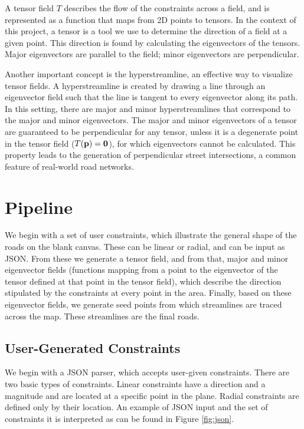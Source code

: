 \documentclass[twocolumn]{article}
\begin{document}
A tensor field $T$ describes the flow of the constraints across a field, and is
represented as a function that maps from 2D points to tensors. In the context
of this project, a tensor is a tool we use to determine the direction of a
field at a given point. This direction is found by calculating the eigenvectors
of the tensors. Major eigenvectors are parallel to the field; minor
eigenvectors are perpendicular.

Another important concept is the hyperstreamline, an effective way to visualize
tensor fields. A hyperstreamline is created by drawing a line through an
eigenvector field such that the line is tangent to every eigenvector along its
path. In this setting, there are major and minor hyperstreamlines that
correspond to the major and minor eigenvectors. The major and minor
eigenvectors of a tensor are guaranteed to be perpendicular for any tensor,
unless it is a degenerate point in the tensor field ($T(\bf p)=0$), for which
eigenvectors cannot be calculated. This property leads to the generation of
perpendicular street intersections, a common feature of real-world road
networks.

\section{Pipeline}\label{sec:pipeline} We begin with a set of user constraints,
which illustrate the general shape of the roads on the blank canvas. These can
be linear or radial, and can be input as JSON. From these we generate a tensor
field, and from that, major and minor eigenvector fields (functions mapping
from a point to the eigenvector of the tensor defined at that point in the
tensor field), which describe the direction stipulated by the constraints at
every point in the area. Finally, based on these eigenvector fields, we
generate seed points from which streamlines are traced across the map. These
streamlines are the final roads.

\subsection{User-Generated Constraints}
We begin with a JSON parser, which accepts user-given constraints. There are
two basic types of constraints. Linear constraints have a direction and a
magnitude and are located at a specific point in the plane. Radial constraints
are defined only by their location. An example of JSON input and the
set of constraints it is interpreted as can be found in Figure \ref{fig:json}.
\end{document}
